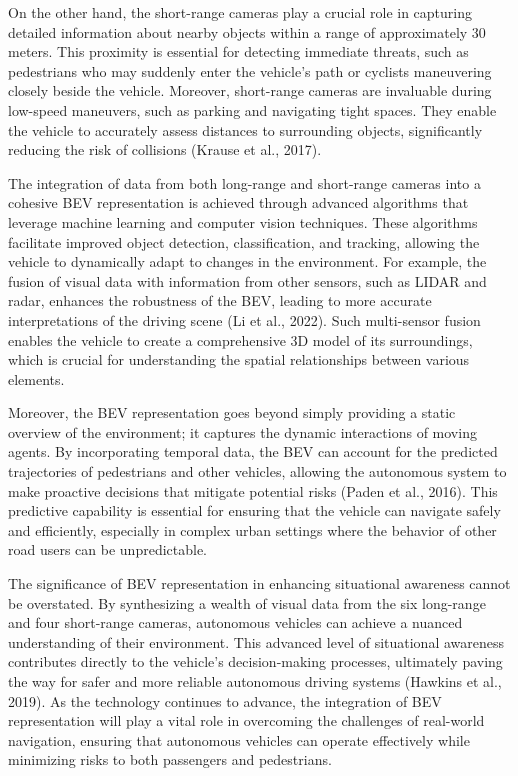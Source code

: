 On the other hand, the short-range cameras play a crucial role in capturing detailed information about nearby objects within a range of approximately 30 meters. This proximity is essential for detecting immediate threats, such as pedestrians who may suddenly enter the vehicle's path or cyclists maneuvering closely beside the vehicle. Moreover, short-range cameras are invaluable during low-speed maneuvers, such as parking and navigating tight spaces. They enable the vehicle to accurately assess distances to surrounding objects, significantly reducing the risk of collisions (Krause et al., 2017).

The integration of data from both long-range and short-range cameras into a cohesive BEV representation is achieved through advanced algorithms that leverage machine learning and computer vision techniques. These algorithms facilitate improved object detection, classification, and tracking, allowing the vehicle to dynamically adapt to changes in the environment. For example, the fusion of visual data with information from other sensors, such as LIDAR and radar, enhances the robustness of the BEV, leading to more accurate interpretations of the driving scene (Li et al., 2022). Such multi-sensor fusion enables the vehicle to create a comprehensive 3D model of its surroundings, which is crucial for understanding the spatial relationships between various elements.

Moreover, the BEV representation goes beyond simply providing a static overview of the environment; it captures the dynamic interactions of moving agents. By incorporating temporal data, the BEV can account for the predicted trajectories of pedestrians and other vehicles, allowing the autonomous system to make proactive decisions that mitigate potential risks (Paden et al., 2016). This predictive capability is essential for ensuring that the vehicle can navigate safely and efficiently, especially in complex urban settings where the behavior of other road users can be unpredictable.

The significance of BEV representation in enhancing situational awareness cannot be overstated. By synthesizing a wealth of visual data from the six long-range and four short-range cameras, autonomous vehicles can achieve a nuanced understanding of their environment. This advanced level of situational awareness contributes directly to the vehicle's decision-making processes, ultimately paving the way for safer and more reliable autonomous driving systems (Hawkins et al., 2019). As the technology continues to advance, the integration of BEV representation will play a vital role in overcoming the challenges of real-world navigation, ensuring that autonomous vehicles can operate effectively while minimizing risks to both passengers and pedestrians.

